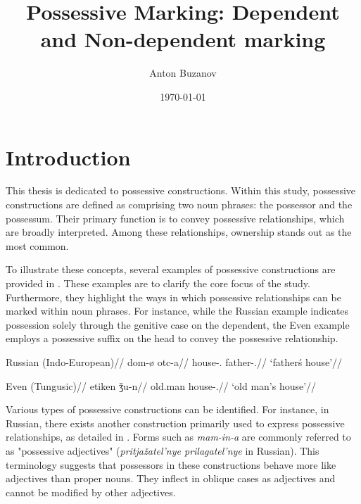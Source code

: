 

\usepackage{multirow}

\singlespacing

\author{Anton Buzanov}
\title{Possessive Marking: Dependent and Non-dependent marking}
\date{\today}


\maketitle

\section{Introduction}

This thesis is dedicated to possessive constructions. Within this study, possessive constructions are defined as comprising two noun phrases: the possessor and the possessum. Their primary function is to convey possessive relationships, which are broadly interpreted. Among these relationships, ownership stands out as the most common.

To illustrate these concepts, several examples of possessive constructions are provided in . These examples are to clarify the core focus of the study. Furthermore, they highlight the ways in which possessive relationships can be marked within noun phrases. For instance, while the Russian example indicates possession solely through the genitive case on the dependent, the Even example employs a possessive suffix on the head to convey the possessive relationship.

\pex
\label{primary_examples}
\a
\begingl
\glpreamble Russian (Indo-European)//
\gla dom-\o{} otc-a//
\glb house-\Nom.\Sg{} father-\Gen.\Sg{}//
\glft `father\'s house'//
\endgl 

\a
\begingl
\glpreamble Even (Tungusic)//
\gla etiken  ǯu-n//
\glb old.man house-\Poss.\Tsg{}//
\glft `old man's house'//
\endgl 
\xe

Various types of possessive constructions can be identified. For instance, in Russian, there exists another construction primarily used to express possessive relationships, as detailed in . Forms such as \textit{mam-in-a} are commonly referred to as "possessive adjectives" (\textit{pritjažatel'nye prilagatel'nye} in Russian). This terminology suggests that possessors in these constructions behave more like adjectives than proper nouns. They inflect in oblique cases as adjectives and cannot be modified by other adjectives.

